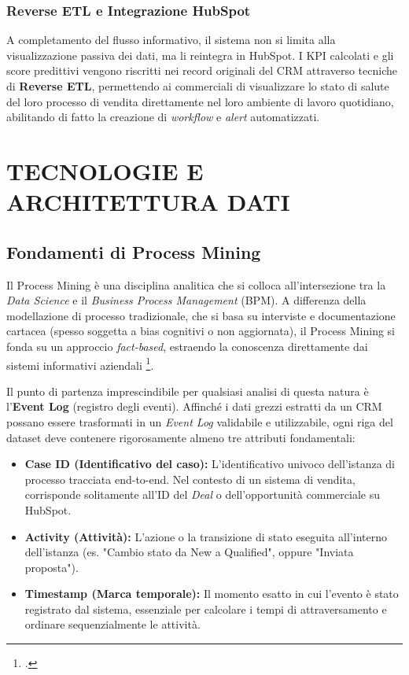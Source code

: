 \documentclass[12pt, a4paper]{report}
\begin{document}
\subsection*{Reverse ETL e Integrazione HubSpot}
A completamento del flusso informativo, il sistema non si limita alla visualizzazione passiva dei dati, ma li reintegra in HubSpot. I KPI calcolati e gli score predittivi vengono riscritti nei record originali del CRM attraverso tecniche di \textbf{Reverse ETL}, permettendo ai commerciali di visualizzare lo stato di salute del loro processo di vendita direttamente nel loro ambiente di lavoro quotidiano, abilitando di fatto la creazione di \textit{workflow} e \textit{alert} automatizzati.

\chapter{TECNOLOGIE E ARCHITETTURA DATI}

\section{Fondamenti di Process Mining}
Il Process Mining è una disciplina analitica che si colloca all'intersezione tra la \textit{Data Science} e il \textit{Business Process Management} (BPM). A differenza della modellazione di processo tradizionale, che si basa su interviste e documentazione cartacea (spesso soggetta a bias cognitivi o non aggiornata), il Process Mining si fonda su un approccio \textit{fact-based}, estraendo la conoscenza direttamente dai sistemi informativi aziendali \footcite{vandaalst}.

Il punto di partenza imprescindibile per qualsiasi analisi di questa natura è l'\textbf{Event Log} (registro degli eventi). Affinché i dati grezzi estratti da un CRM possano essere trasformati in un \textit{Event Log} validabile e utilizzabile, ogni riga del dataset deve contenere rigorosamente almeno tre attributi fondamentali:

\begin{itemize}
    \item \textbf{Case ID (Identificativo del caso):} L'identificativo univoco dell'istanza di processo tracciata end-to-end. Nel contesto di un sistema di vendita, corrisponde solitamente all'ID del \textit{Deal} o dell'opportunità commerciale su HubSpot.
    \item \textbf{Activity (Attività):} L'azione o la transizione di stato eseguita all'interno dell'istanza (es. "Cambio stato da New a Qualified", oppure "Inviata proposta").
    \item \textbf{Timestamp (Marca temporale):} Il momento esatto in cui l'evento è stato registrato dal sistema, essenziale per calcolare i tempi di attraversamento e ordinare sequenzialmente le attività.
\end{itemize}
\end{document}
